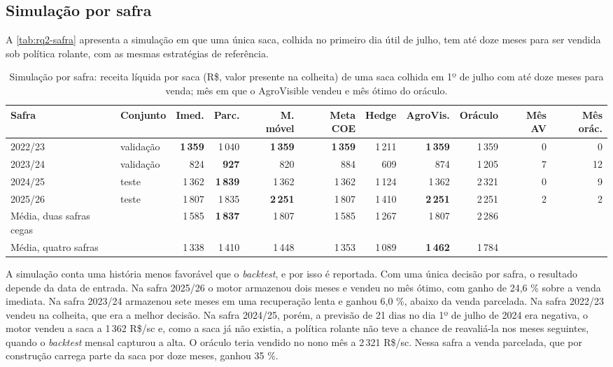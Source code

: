 \subsection{Simulação por safra}\label{sec2:res-safra}

A \autoref{tab:rq2-safra} apresenta a simulação em que uma única saca, colhida no primeiro dia útil de julho, tem até doze meses para ser vendida sob política rolante, com as mesmas estratégias de referência.

\begin{table}[htb]
	\centering
	\caption{Simulação por safra: receita líquida por saca (R\$, valor presente na colheita) de uma saca colhida em 1º de julho com até doze meses para venda; mês em que o AgroVisible vendeu e mês ótimo do oráculo.}\label{tab:rq2-safra}
	\footnotesize
	\setlength{\tabcolsep}{3.5pt}
	\begin{tabular}{l l r r r r r r r r r}
		\hline
		\textbf{Safra} & \textbf{Conjunto} & \textbf{Imed.} & \textbf{Parc.} & \textbf{M. móvel} & \textbf{Meta COE} & \textbf{Hedge} & \textbf{AgroVis.} & \textbf{Oráculo} & \textbf{Mês AV} & \textbf{Mês orác.} \\ \hline
		2022/23 & validação & \textbf{1\,359} & 1\,040 & \textbf{1\,359} & \textbf{1\,359} & 1\,211 & \textbf{1\,359} & 1\,359 & 0 & 0 \\
		2023/24 & validação & 824 & \textbf{927} & 820 & 884 & 609 & 874 & 1\,205 & 7 & 12 \\
		2024/25 & teste & 1\,362 & \textbf{1\,839} & 1\,362 & 1\,362 & 1\,124 & 1\,362 & 2\,321 & 0 & 9 \\
		2025/26 & teste & 1\,807 & 1\,835 & \textbf{2\,251} & 1\,807 & 1\,410 & \textbf{2\,251} & 2\,251 & 2 & 2 \\ \hline
		Média, duas safras cegas & & 1\,585 & \textbf{1\,837} & 1\,807 & 1\,585 & 1\,267 & 1\,807 & 2\,286 & & \\
		Média, quatro safras & & 1\,338 & 1\,410 & 1\,448 & 1\,353 & 1\,089 & \textbf{1\,462} & 1\,784 & & \\ \hline
	\end{tabular}
\end{table}

A simulação conta uma história menos favorável que o \textit{backtest}, e por isso é reportada. Com uma única decisão por safra, o resultado depende da data de entrada. Na safra 2025/26 o motor armazenou dois meses e vendeu no mês ótimo, com ganho de 24,6 \% sobre a venda imediata. Na safra 2023/24 armazenou sete meses em uma recuperação lenta e ganhou 6,0 \%, abaixo da venda parcelada. Na safra 2022/23 vendeu na colheita, que era a melhor decisão. Na safra 2024/25, porém, a previsão de 21 dias no dia 1º de julho de 2024 era negativa, o motor vendeu a saca a 1\,362 R\$/sc e, como a saca já não existia, a política rolante não teve a chance de reavaliá-la nos meses seguintes, quando o \textit{backtest} mensal capturou a alta. O oráculo teria vendido no nono mês a 2\,321 R\$/sc. Nessa safra a venda parcelada, que por construção carrega parte da saca por doze meses, ganhou 35 \%.

